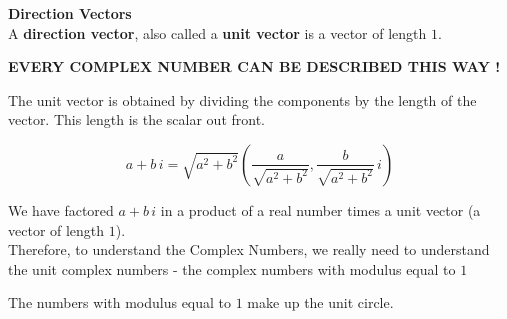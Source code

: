 \documentclass{ximera}
\begin{document}
\begin{definition}  \textbf{\textcolor{green!50!black}{Direction Vectors}}   \\

A \textbf{direction vector}, also called a \textbf{unit vector} is a vector of length $1$.

\end{definition}










\begin{center}

\textbf{\Huge{\textcolor{purple!50!blue!90!black}{EVERY COMPLEX NUMBER CAN BE DESCRIBED THIS WAY !}}}

\end{center}




The unit vector is obtained by dividing the components by the length of the vector.  This length is the scalar out front.




\[     a + b \, i    =  \sqrt{a^2 + b^2}  \left(  \frac{a}{\sqrt{a^2 + b^2}}, \frac{b}{\sqrt{a^2 + b^2}} \, i \right)                      \]


We have factored $a + b \, i $ in a product of a real number times a unit vector (a vector of length $1$). \\










Therefore, to understand the Complex Numbers, we really need to understand the unit complex numbers - the complex numbers with modulus equal to $1$



The numbers with modulus equal to $1$ make up the unit circle.
\end{document}
